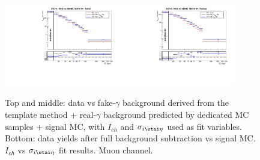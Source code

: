 \begin{figure}[htb]
\begin{center}
\includegraphics[width=0.45\textwidth]{../figs/figs_v11/MUON_WGamma/PrepareYields/c_BkgSubtrDATAvsSIGMC_c_MUON_WGamma__UNblind__Barrel__phoEt.pdf}\includegraphics[width=0.45\textwidth]{../figs/figs_v11/MUON_WGamma/PrepareYields/c_BkgSubtrDATAvsSIGMC_c_MUON_WGamma__UNblind__Endcap__phoEt.pdf}\\
  \caption{Top and middle: data vs fake-$\gamma$ background derived from the template method + real-$\gamma$ background predicted by dedicated MC samples + signal MC, with $I_{ch}$ and $\sigma_{i\etai\eta}$ used as fit variables. Bottom: data yields after full background subtraction vs signal MC. $I_{ch}$ vs $\sigma_{i\etai\eta}$ fit results. Muon channel.}
  \label{fig:DDvsMC_Wg_Data_MUON}
  \end{center}
\end{figure}

